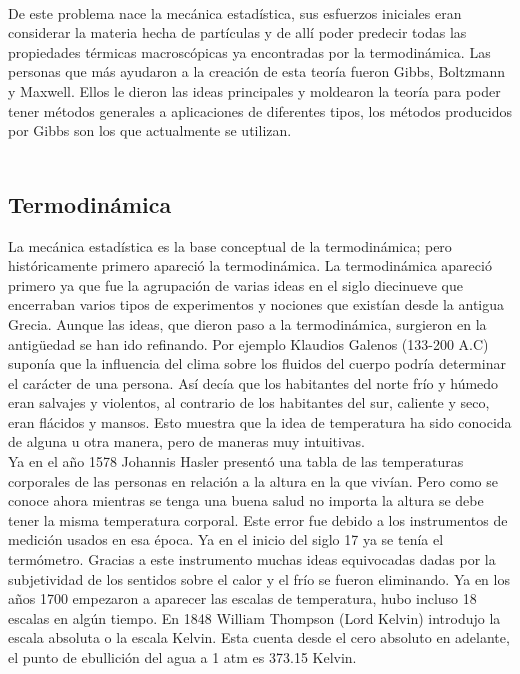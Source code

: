 \\
De este problema nace la mecánica estadística, sus esfuerzos iniciales eran considerar la materia hecha de partículas y de allí poder predecir todas las propiedades térmicas macroscópicas ya encontradas por la termodinámica. Las personas que más ayudaron a la creación de esta teoría fueron Gibbs, Boltzmann y Maxwell. Ellos le dieron las ideas principales y moldearon la teoría para poder tener métodos generales a aplicaciones de diferentes tipos, los métodos producidos por Gibbs son los que actualmente se utilizan.
\\
\\
\subsection{Termodinámica}
La mecánica estadística es la base conceptual de la termodinámica; pero históricamente primero apareció la termodinámica. La termodinámica apareció primero ya que fue la agrupación de varias ideas en el siglo diecinueve que encerraban varios tipos de experimentos  y nociones que existían desde la antigua Grecia. Aunque las ideas, que dieron paso a la termodinámica, surgieron en la antigüedad se han ido refinando. Por ejemplo Klaudios Galenos (133-200 A.C) suponía que la influencia del clima sobre los fluidos del cuerpo podría determinar el carácter de una persona. Así decía que los habitantes del norte frío y húmedo eran salvajes y violentos, al contrario de los habitantes del sur, caliente y seco, eran flácidos y mansos. Esto muestra que la idea de temperatura ha sido conocida de alguna u otra manera, pero de maneras muy intuitivas. 
\\
Ya en el año 1578  Johannis Hasler presentó una tabla de las temperaturas corporales de las personas en relación a la altura en la que vivían. Pero como se conoce ahora mientras se tenga una buena salud no importa la altura se debe tener la misma temperatura corporal. Este error fue debido a los instrumentos de medición usados en esa época. Ya en el inicio del siglo 17 ya se tenía el termómetro. Gracias a este instrumento muchas ideas equivocadas dadas por la subjetividad de los sentidos sobre el calor y el frío se fueron eliminando. Ya en los años 1700 empezaron a aparecer las escalas de temperatura, hubo incluso 18 escalas en algún tiempo. En 1848 William Thompson (Lord Kelvin)  introdujo la escala absoluta o la escala Kelvin. Esta cuenta desde el cero absoluto en adelante, el punto de ebullición del agua a  1 atm es 373.15 Kelvin.
\\
